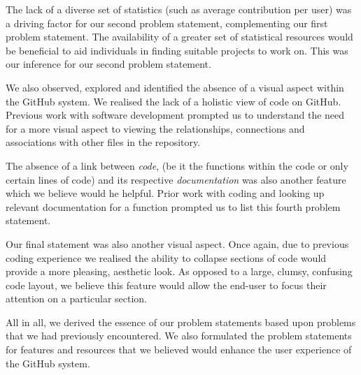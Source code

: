 \documentclass[12pt]{article}
\begin{document}
The lack of a diverse set of statistics (such as average contribution per user) was a driving factor for our second problem statement, complementing our first problem statement. The availability of a greater set of statistical resources would be beneficial to aid individuals in finding suitable projects to work on. This was our inference for our second problem statement.

We also observed, explored and identified the absence of a visual aspect within the \textsf{GitHub} system. We realised the lack of a holistic view of code on \textsf{GitHub}. Previous work with software development prompted us to understand the need for a more visual aspect to viewing the relationships, connections and associations with other files in the repository.

The absence of a link between \textit{code}, (be it the functions within the code or only certain lines of code) and its respective \textit{documentation} was also another feature which we believe would he helpful. Prior work with coding and looking up relevant documentation for a function prompted us to list this fourth problem statement.

Our final statement was also another visual aspect. Once again, due to previous coding experience we realised the ability to collapse sections of code would provide a more pleasing, aesthetic look. As opposed to a large, clumsy, confusing code layout, we believe this feature would allow the end-user to focus their attention on a particular section.

All in all, we derived the essence of our problem statements based upon problems that we had previously encountered. We also formulated the problem statements for features and resources that we believed would enhance the user experience of the \textsf{GitHub} system.
\end{document}
